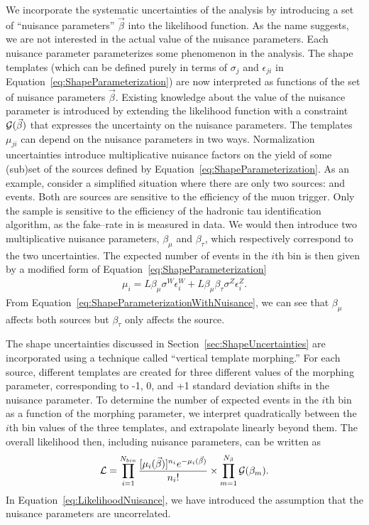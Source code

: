 We incorporate the systematic uncertainties of the analysis  by introducing a
set of ``nuisance parameters'' $\vec \beta$ into the likelihood function.  As
the name suggests, we are not interested in the actual value of the nuisance
parameters.  Each nuisance parameter parameterizes some phenomenon in the
analysis.  The shape templates (which can be defined purely in terms of
$\sigma_j$ and $\epsilon_{ji}$ in Equation~\ref{eq:ShapeParameterization}) are
now interpreted as functions of the set of nuisance parameters $\vec \beta$.
Existing knowledge about the value of the nuisance parameter is introduced by
extending the likelihood function with a constraint ${\cal G}(\vec \beta)$ 
that expresses the uncertainty on the nuisance parameters. 
The templates $\mu_{ji}$ can depend on the nuisance parameters in two ways.
Normalization uncertainties introduce multiplicative nuisance factors on the
yield of some (sub)set of the sources defined by
Equation~\ref{eq:ShapeParameterization}.  As an example, consider a simplified
situation where there are only two sources: \ZTT and \WpJets events.  Both are
sources are sensitive to the efficiency of the muon trigger.  Only the \ZTT
sample is sensitive to the efficiency of the hadronic tau identification
algorithm, as the fake--rate in \WpJets is measured in data.  We would then
introduce two multiplicative nuisance parameters, $\beta_\mu$ and $\beta_\tau$,
which respectively correspond to the two uncertainties.  The expected number of
events in the \mbox{$i$th} bin is then given by a modified form of
Equation~\ref{eq:ShapeParameterization}
\begin{eqnarray}
  \mu_i = L \beta_\mu \sigma^W \epsilon^W_{i} 
  + L \beta_\mu \beta_\tau  \sigma^Z \epsilon^Z_i.
  \label{eq:ShapeParameterizationWithNuisance}
\end{eqnarray}
From Equation~\ref{eq:ShapeParameterizationWithNuisance}, we can see that
$\beta_\mu$ affects both sources but $\beta_\tau$ only
affects the \ZTT source.

The shape uncertainties discussed in Section~\ref{sec:ShapeUncertainties} are
incorporated using a technique called ``vertical template morphing.''  For each
source, different templates are created for three different values of the
morphing parameter, corresponding to -1, 0, and +1 standard deviation shifts in
the nuisance parameter. To determine the number of expected events in the $i$th
bin as a function of the morphing parameter, we interpret quadratically between
the $i$th bin values of the three templates, and extrapolate linearly beyond
them.
The overall likelihood then, including nuisance parameters, can be written as
\begin{equation}
  {\cal L} = \prod_{i=1}^{N_{bin}} 
  \frac{[\mu_i(\vec \beta)]^{n_i} e^{-\mu_i(\vec \beta)}}{n_i!} 
  \times \prod_{m=1}^{N_\beta}{\cal G}(\beta_m).
  \label{eq:LikelihoodNuisance}
\end{equation}
In Equation~\ref{eq:LikelihoodNuisance}, we have introduced the assumption that
the nuisance parameters are uncorrelated.  

